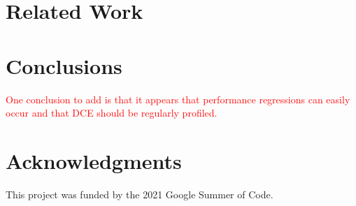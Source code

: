 \documentclass{sig-alternate}
\begin{document}
\section{Related Work}

\section{Conclusions}

\textcolor{red}{One conclusion to add is that it appears that performance regressions
can easily occur and that DCE should be regularly profiled.}

\section{Acknowledgments}
This project was funded by the 2021 Google Summer of Code.
%

%
%
\end{document}
